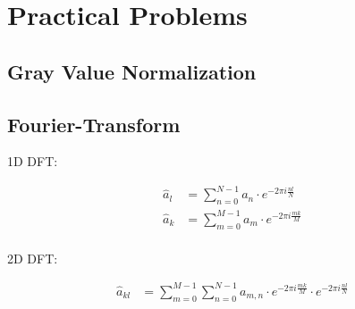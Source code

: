 \documentclass[a4paper,12pt]{article}
\begin{document}
	
	\section{Practical Problems}
	\subsection{Gray Value Normalization}
	\subsection{Fourier-Transform}
	
	1D DFT:
	
	\begin{align*}
		\hat{a}_l &= \sum\limits_{n = 0}^{N - 1} a_n \cdot e^{-2 \pi i \frac{nl}{N}} \\
		\hat{a}_k &= \sum\limits_{m = 0}^{M - 1} a_m \cdot e^{-2 \pi i \frac{mk}{M}} \\
	\end{align*}
	
	2D DFT:
	
	\begin{align*}
	\hat{a}_{kl} &= \sum\limits_{m = 0}^{M - 1} \sum\limits_{n = 0}^{N - 1} a_{m, n} \cdot e^{-2 \pi i \frac{mk}{M}} \cdot e^{-2 \pi i \frac{nl}{N}} \\
	\end{align*}
\end{document}
